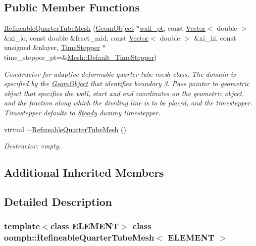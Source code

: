 \subsection*{Public Member Functions}
\begin{DoxyCompactItemize}
\item 
\hyperlink{classoomph_1_1RefineableQuarterTubeMesh_a8aaace5bc465614ace0a9117b3ee169c}{Refineable\+Quarter\+Tube\+Mesh} (\hyperlink{classoomph_1_1GeomObject}{Geom\+Object} $\ast$\hyperlink{classoomph_1_1QuarterTubeMesh_af59c4cde343ddd76caea4bc8c8ad8b94}{wall\+\_\+pt}, const \hyperlink{classoomph_1_1Vector}{Vector}$<$ double $>$ \&xi\+\_\+lo, const double \&fract\+\_\+mid, const \hyperlink{classoomph_1_1Vector}{Vector}$<$ double $>$ \&xi\+\_\+hi, const unsigned \&nlayer, \hyperlink{classoomph_1_1TimeStepper}{Time\+Stepper} $\ast$time\+\_\+stepper\+\_\+pt=\&\hyperlink{classoomph_1_1Mesh_a12243d0fee2b1fcee729ee5a4777ea10}{Mesh\+::\+Default\+\_\+\+Time\+Stepper})
\begin{DoxyCompactList}\small\item\em Constructor for adaptive deformable quarter tube mesh class. The domain is specified by the \hyperlink{classoomph_1_1GeomObject}{Geom\+Object} that identifies boundary 3. Pass pointer to geometric object that specifies the wall, start and end coordinates on the geometric object, and the fraction along which the dividing line is to be placed, and the timestepper. Timestepper defaults to \hyperlink{classoomph_1_1Steady}{Steady} dummy timestepper. \end{DoxyCompactList}\item 
virtual \hyperlink{classoomph_1_1RefineableQuarterTubeMesh_a229ad0335ba60176c578897b558790eb}{$\sim$\+Refineable\+Quarter\+Tube\+Mesh} ()
\begin{DoxyCompactList}\small\item\em Destructor\+: empty. \end{DoxyCompactList}\end{DoxyCompactItemize}
\subsection*{Additional Inherited Members}


\subsection{Detailed Description}
\subsubsection*{template$<$class E\+L\+E\+M\+E\+NT$>$\newline
class oomph\+::\+Refineable\+Quarter\+Tube\+Mesh$<$ E\+L\+E\+M\+E\+N\+T $>$}

